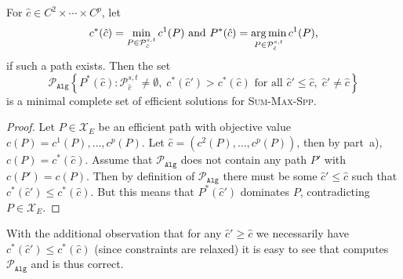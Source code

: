 \documentclass[11pt,a4paper,parskip=half-]{scrartcl}
\begin{document}
\begin{solution}
\begin{enumerate}
	\begin{lemma}
	For $\hat c \in C^2 \times \dotsm \times C^p$, let
	\[c^*(\hat c) = \min_{P \in \mathcal P^{s,t}_{\hat c}} c^1(P)\text{ and }
	P^*(\hat c) = \operatorname*{arg\,min}_{P \in \mathcal P^{s,t}_{\hat c}} c^1(P)\text{,}\]
	if such a path exists. Then the set \[ \mathcal P_{\mathtt{Alg}}\left\{P^*(\hat c):  
	\mathcal P^{s,t}_{\hat c} \neq \emptyset,\; c^*(\hat c') > c^*(\hat c)\text{ for all }
	\hat c' \leq \hat c,\; \hat c' \neq \hat c\right\}\]
	is a minimal complete set of efficient solutions for \textsc{Sum-Max-Spp}.
	\end{lemma}
	\begin{proof}
	Let $P \in \mathcal X_E$ be an efficient path with objective value
	$c(P) = c^1(P), \dotsc, c^p(P)$. Let $\hat c = (c^2(P), \dotsc, c^p(P))$, then
	by part~a), $c(P) = c^*(\hat c)$. Assume that $\mathcal P_{\mathtt{Alg}}$ does
	not contain any path $P'$ with $c(P') = c(P)$. Then by definition of
	$\mathcal P_{\mathtt{Alg}}$ there must be some $\hat c' \leq \hat c$
	such that $c^*(\hat c') \leq c^*(\hat c)$. But this means that $P^*(\hat c')$ 
	dominates $P$, contradicting $P \in \mathcal X_E$.
	\end{proof}
	With the additional observation that for any $\hat c' \geq \hat c$ we necessarily have $c^*(\hat c') \leq  c^*(\hat c)$ (since constraints are relaxed)
	it is easy to see that  computes $\mathcal P_{\mathtt{Alg}}$ and is thus correct.
	

\end{enumerate}
\end{solution}
\end{document}
